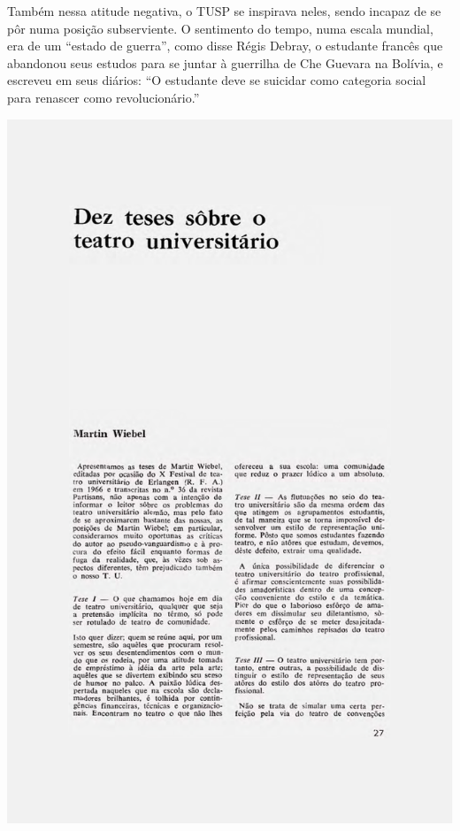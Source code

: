 Também nessa atitude negativa, o TUSP se inspirava neles, sendo incapaz
de se pôr numa posição subserviente. O sentimento do tempo, numa escala
mundial, era de um “estado de guerra”, como disse Régis Debray, o
estudante francês que abandonou seus estudos para se juntar à guerrilha
de Che Guevara na Bolívia, e escreveu em seus diários: “O estudante deve
se suicidar como categoria social para renascer como revolucionário.”

\includegraphics[width=\columnwidth]{media/DOC1.pdf}

